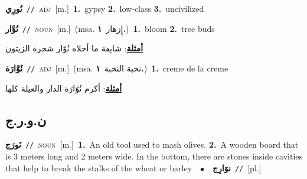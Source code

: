\documentclass[10pt,a4paper,twoside]{article} %
\begin{document}
\begin{multicols}{2}
{\setlength\topsep{0pt}\textbf{\foreignlanguage{arabic}{نُورِي}}\ {\color{gray}\texttt{//}\color{black}}\ \textsc{adj}\ [m.]\ \textbf{1.}~gypsy  \textbf{2.}~low-class  \textbf{3.}~uncivilized\ } \vspace{2mm}

{\setlength\topsep{0pt}\textbf{\foreignlanguage{arabic}{نُوَّار}}\ {\color{gray}\texttt{//}\color{black}}\ \textsc{noun}\ [m.]\ \color{gray}(msa. \foreignlanguage{arabic}{إِزهار}~\foreignlanguage{arabic}{\textbf{١.}})\color{black}\ \textbf{1.}~bloom  \textbf{2.}~tree buds\  \begin{flushright}\color{gray}\foreignlanguage{arabic}{\textbf{\underline{\foreignlanguage{arabic}{أمثلة}}}: شايفة ما أحلاه نُوّار شجرة الزيتون}\end{flushright}\color{black}} \vspace{2mm}

{\setlength\topsep{0pt}\textbf{\foreignlanguage{arabic}{نُوَّارَة}}\ {\color{gray}\texttt{//}\color{black}}\ \textsc{adj}\ [m.]\ \color{gray}(msa. \foreignlanguage{arabic}{نخبة النخبة}~\foreignlanguage{arabic}{\textbf{١.}})\color{black}\ \textbf{1.}~creme de la creme\  \begin{flushright}\color{gray}\foreignlanguage{arabic}{\textbf{\underline{\foreignlanguage{arabic}{أمثلة}}}: أكرم نُوّارَة الدار والعيلة كلها}\end{flushright}\color{black}} \vspace{2mm}

\vspace{-3mm}
\subsection*{\color{blue}\foreignlanguage{arabic}{ن.و.ر.ج}\color{blue}{ (ntws)}} 

{\setlength\topsep{0pt}\textbf{\foreignlanguage{arabic}{نَورَج}}\ {\color{gray}\texttt{//}\color{black}}\ \textsc{noun}\ [m.]\ \textbf{1.}~An old tool used to mash olives.  \textbf{2.}~A wooden board that is 3 meters long and 2 meters wide. In the bottom, there are stones inside cavities that help to break the stalks of the wheat or barley\ \ $\bullet$\ \ \setlength\topsep{0pt}\textbf{\foreignlanguage{arabic}{نوَارِج}}\ {\color{gray}\texttt{//}\color{black}}\ [pl.]\ } \vspace{2mm}


\end{multicols}
\end{document}
